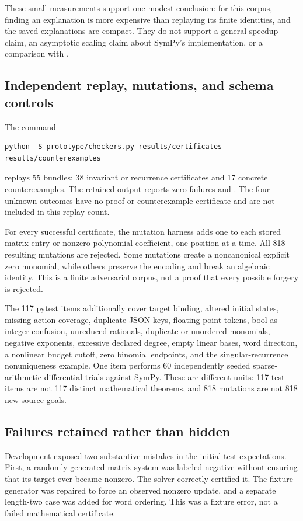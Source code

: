 These small measurements support one modest conclusion: for this corpus,
finding an explanation is more expensive than replaying its finite identities,
and the saved explanations are compact. They do not support a general speedup
claim, an asymptotic scaling claim about SymPy's implementation, or a comparison
with .

\subsection{Independent replay, mutations, and schema controls}

The command
\begin{lstlisting}
python -S prototype/checkers.py results/certificates results/counterexamples
\end{lstlisting}
replays 55 bundles: 38 invariant or recurrence certificates and 17 concrete
counterexamples. The retained output reports zero failures and
. The four unknown outcomes have no proof or
counterexample certificate and are not included in this replay count.

For every successful certificate, the mutation harness adds one to each stored
matrix entry or nonzero polynomial coefficient, one position at a time. All
818 resulting mutations are rejected. Some mutations create a noncanonical
explicit zero monomial, while others preserve the encoding and break an
algebraic identity. This is a finite adversarial corpus, not a proof that every
possible forgery is rejected.

The 117 pytest items additionally cover target binding, altered initial states,
missing action coverage, duplicate JSON keys, floating-point tokens,
bool-as-integer confusion, unreduced rationals, duplicate or unordered
monomials, negative exponents, excessive declared degree, empty linear bases,
word direction, a nonlinear budget cutoff, zero binomial endpoints, and the
singular-recurrence nonuniqueness example. One item performs 60 independently
seeded sparse-arithmetic differential trials against SymPy. These are different
units: 117 test items are not 117 distinct mathematical theorems, and 818
mutations are not 818 new source goals.

\subsection{Failures retained rather than hidden}

Development exposed two substantive mistakes in the initial test expectations.
First, a randomly generated matrix system was labeled negative without ensuring
that its target ever became nonzero. The solver correctly certified it. The
fixture generator was repaired to force an observed nonzero update, and a
separate length-two case was added for word ordering. This was a fixture error,
not a failed mathematical certificate.

